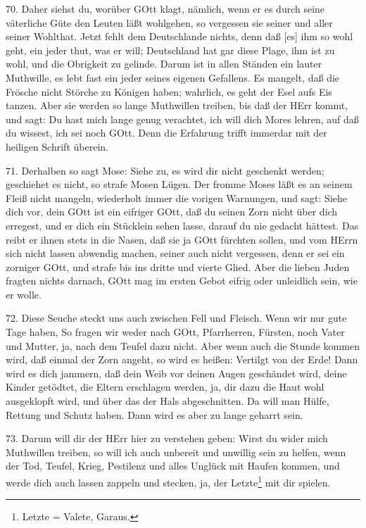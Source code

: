 70. Daher siehst du, worüber GOtt klagt, nämlich, wenn er es durch seine väterliche Güte den Leuten läßt wohlgehen, so vergessen sie seiner und aller seiner Wohlthat. Jetzt fehlt dem Deutschlande nichts, denn daß [es] ihm so wohl geht, ein jeder thut, was er will; Deutschland hat gar diese Plage, ihm ist zu wohl, und die Obrigkeit zu gelinde. Darum ist in allen Ständen ein lauter Muthwille, es lebt fast ein jeder seines eigenen Gefallens. Es mangelt, daß die Frösche nicht Störche zu Königen haben; wahrlich, es geht der Esel aufs Eis tanzen. Aber sie werden so lange Muthwillen treiben, bis daß der HErr kommt, und sagt: Du hast mich lange genug verachtet, ich will dich Mores lehren, auf daß du wissest, ich sei noch GOtt. Denn die Erfahrung trifft immerdar mit der heiligen Schrift überein.

71. Derhalben so sagt Mose: Siehe zu, es wird dir nicht geschenkt werden; geschiehet es nicht, so strafe Mosen Lügen. Der fromme Moses läßt es an seinem Fleiß nicht mangeln, wiederholt immer die vorigen Warnungen, und sagt: Siehe dich vor, dein GOtt ist ein eifriger GOtt, daß du seinen Zorn nicht über dich erregest, und er dich ein Stücklein sehen lasse, darauf du nie gedacht hättest. Das reibt er ihnen stets in die Nasen, daß sie ja GOtt fürchten sollen, und vom HErrn sich nicht lassen abwendig machen, seiner auch nicht vergessen, denn er sei ein zorniger GOtt, und strafe bis ins dritte und vierte Glied. Aber die lieben Juden fragten nichts darnach, GOtt mag im ersten Gebot eifrig oder unleidlich sein, wie er wolle.

72. Diese Seuche steckt uns auch zwischen Fell und Fleisch. Wenn wir nur gute Tage haben,
So fragen wir weder nach GOtt, Pfarrherren, Fürsten, noch Vater und Mutter, ja, nach dem Teufel dazu nicht. Aber wenn auch die Stunde kommen wird, daß einmal der Zorn angeht, so wird es heißen: Vertilgt von der Erde! Dann wird es dich jammern, daß dein Weib vor deinen Augen geschändet wird, deine Kinder getödtet, die Eltern erschlagen werden, ja, dir dazu die Haut wohl ausgeklopft wird, und über das der Hals abgeschnitten. Da will man Hülfe, Rettung und Schutz haben. Dann wird es aber zu lange geharrt sein.

73. Darum will dir der HErr hier zu verstehen geben: Wirst du wider mich Muthwillen treiben, so will ich auch unbereit und unwillig sein zu helfen, wenn der Tod, Teufel, Krieg, Pestilenz und alles Unglück mit Haufen kommen, und werde dich auch lassen zappeln und stecken, ja, der Letzte\footnote{Letzte = Valete, Garaus.} mit dir spielen.


